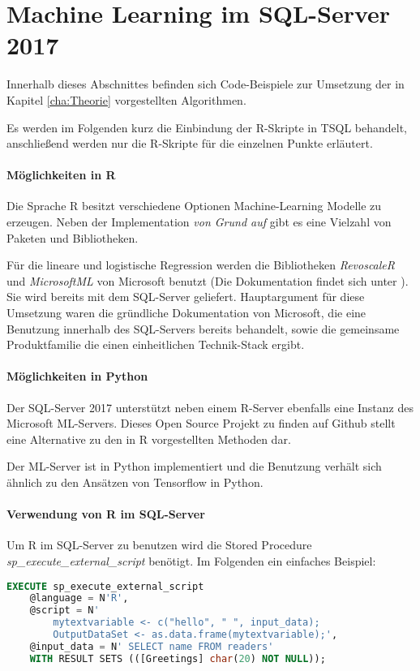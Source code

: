\section{Machine Learning im SQL-Server 2017}
\label{sec:MLSQL} \label{sec:MachineLearning}
Innerhalb dieses Abschnittes befinden sich Code-Beispiele zur Umsetzung der in Kapitel \ref{cha:Theorie} vorgestellten Algorithmen. 

Es werden im Folgenden kurz die Einbindung der R-Skripte in TSQL behandelt, anschließend werden nur die R-Skripte für die einzelnen Punkte erläutert.
\paragraph{Möglichkeiten in  R}
Die Sprache R besitzt verschiedene Optionen Machine-Learning Modelle zu erzeugen. Neben der Implementation \textit{von Grund auf} gibt es eine Vielzahl von Paketen und Bibliotheken. 

Für die lineare und logistische Regression werden die Bibliotheken \textit{RevoscaleR} und \textit{MicrosoftML} von Microsoft benutzt (Die Dokumentation findet sich unter \cite{RevoscaleR}). Sie wird bereits mit dem SQL-Server geliefert. Hauptargument für diese Umsetzung waren die gründliche Dokumentation von Microsoft, die eine Benutzung innerhalb des SQL-Servers bereits behandelt, sowie die gemeinsame Produktfamilie die einen einheitlichen Technik-Stack ergibt. 
\paragraph{Möglichkeiten in Python}
Der SQL-Server 2017 unterstützt neben einem R-Server ebenfalls eine Instanz des Microsoft ML-Servers. Dieses Open Source Projekt zu finden auf Github \cite{GithubMLServer} stellt eine Alternative zu den in R vorgestellten Methoden dar. 

Der ML-Server ist in Python implementiert und die Benutzung verhält sich ähnlich zu den Ansätzen von Tensorflow in Python. 

\paragraph{Verwendung von R im SQL-Server}
Um R im SQL-Server zu benutzen wird die Stored Procedure \textit{sp\_execute\_external\_script} benötigt. Im Folgenden ein einfaches Beispiel: ~\newline

\begin{lstlisting}[language=SQL]
	EXECUTE sp_execute_external_script
	@language = N'R',
	@script = N' 
		mytextvariable <- c("hello", " ", input_data);
		OutputDataSet <- as.data.frame(mytextvariable);',
	@input_data = N' SELECT name FROM readers'
	WITH RESULT SETS (([Greetings] char(20) NOT NULL));
\end{lstlisting}

